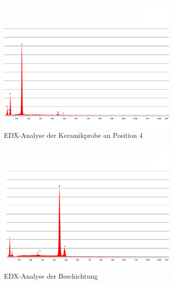 \documentclass[12pt,english,ngerman]{scrartcl}
\begin{document}
\begin{figure}[H]
	\begin{center}
		\includegraphics[width =0.8\textwidth]{./figures/edx4.png}
	\end{center}
	\caption{EDX-Analyse der Keramikprobe an Position 4~\cite{sein_foto}
	}\label{fig:position4}
\end{figure}

\begin{figure}[H]
	\begin{center}
		\includegraphics[width =0.8\textwidth]{./figures/beschichtung.png}
	\end{center}
	\caption{EDX-Analyse der Beschichtung~\cite{sein_foto}
	}\label{fig:beschichtung}
\end{figure}
\end{document}
